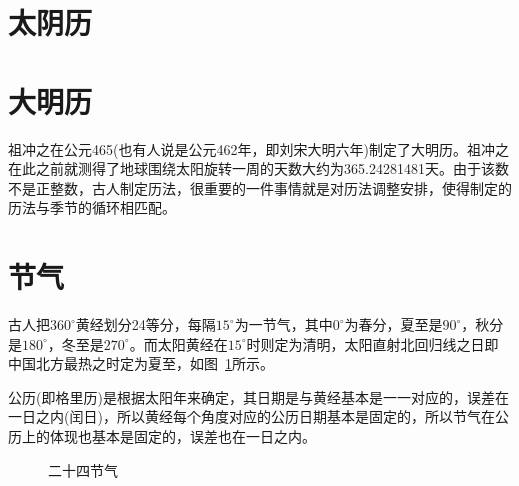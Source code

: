 \section{太阴历}
\label{sec:tai-yin-calendar}



\section{大明历}
\label{sec:da-ming-calendar}

祖冲之在公元465(也有人说是公元462年，即刘宋大明六年)制定了大明历。祖冲之在此之前就测得了地球围绕太阳旋转一周的天数大约为365.24281481天。由于该数不是正整数，古人制定历法，很重要的一件事情就是对历法调整安排，使得制定的历法与季节的循环相匹配。

\section{节气}
\label{sec:jie-qi}

古人把$360^\circ$黄经划分24等分，每隔$15^\circ$为一节气，其中$0^\circ$为春分，夏至是$90^\circ$，秋分是$180^\circ$，冬至是$270^\circ$。而太阳黄经在$15^\circ$时则定为清明，太阳直射北回归线之日即中国北方最热之时定为夏至，如图~\ref{fig:24-jie-qi}所示。

公历(即格里历)是根据太阳年来确定，其日期是与黄经基本是一一对应的，误差在一日之内(闰日)，所以黄经每个角度对应的公历日期基本是固定的，所以节气在公历上的体现也基本是固定的，误差也在一日之内。

\begin{figure}[htbp]
  \centering
  \caption{二十四节气}
  \label{fig:24-jie-qi}
\end{figure}

